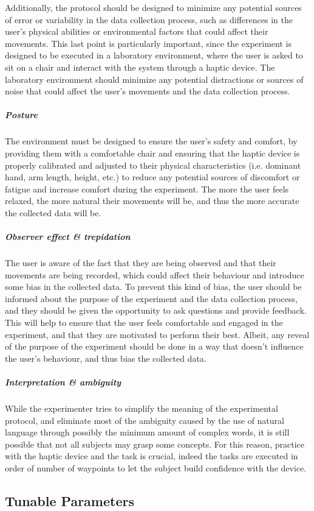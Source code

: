 \documentclass[12pt]{report}
\begin{document}
Additionally, the protocol should be designed to minimize any potential sources of error or variability in the data collection process, such as differences in the user's physical abilities or environmental factors that could affect their movements. This last point is particularly important, since the experiment is designed to be executed in a laboratory environment, where the user is asked to sit on a chair and interact with the system through a haptic device. The laboratory environment should minimize any potential distractions or sources of noise that could affect the user's movements and the data collection process. 

\subparagraph{Posture} The environment must be designed to ensure the user's safety and comfort, by providing them with a comfortable chair and ensuring that the haptic device is properly calibrated and adjusted to their physical characteristics (i.e. dominant hand, arm length, height, etc.) to reduce any potential sources of discomfort or fatigue and increase comfort during the experiment. The more the user feels relaxed, the more natural their movements will be, and thus the more accurate the collected data will be. 

\subparagraph{Observer effect \& trepidation} The user is aware of the fact that they are being observed and that their movements are being recorded, which could affect their behaviour and introduce some bias in the collected data. To prevent this kind of bias, the user should be informed about the purpose of the experiment and the data collection process, and they should be given the opportunity to ask questions and provide feedback. This will help to ensure that the user feels comfortable and engaged in the experiment, and that they are motivated to perform their best. Albeit, any reveal of the purpose of the experiment should be done in a way that doesn't influence the user's behaviour, and thus bias the collected data.

\subparagraph{Interpretation \& ambiguity} While the experimenter tries to simplify the meaning of the experimental protocol, and eliminate most of the ambiguity caused by the use of natural language through possibly the minimum amount of complex words, it is still possible that not all subjects may grasp some concepts. For this reason, practice with the haptic device and the task is crucial, indeed the tasks are executed in order of number of waypoints to let the subject build confidence with the device.

\subsection{Tunable Parameters}
\end{document}
